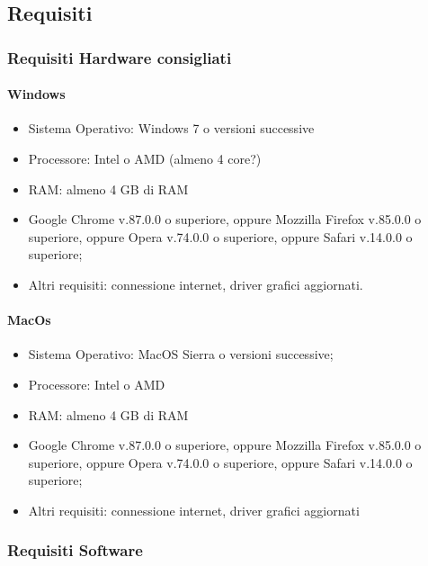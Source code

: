 \documentclass[../manuale_utente.tex]{subfiles}
\begin{document}
\subsection{Requisiti}
    \label{sec:requisiti}
\subsubsection{Requisiti Hardware consigliati}
    \label{subsub:req_h}

\paragraph{Windows}
    \label{par:Windows_req}

\begin{itemize}
    \item Sistema Operativo: Windows 7 o versioni successive
    \item Processore: Intel o AMD (almeno 4 core?)
    \item RAM: almeno 4 GB di RAM
    \item Google Chrome v.87.0.0 o superiore, oppure Mozzilla Firefox v.85.0.0 o superiore, oppure Opera v.74.0.0 o superiore, oppure Safari v.14.0.0 o superiore;
    \item Altri requisiti: connessione internet, driver grafici aggiornati.
\end{itemize}

\paragraph{MacOs}
    \label{par:mac_req}

\begin{itemize}
    \item Sistema Operativo: MacOS Sierra o versioni successive;
    \item Processore: Intel o AMD
    \item RAM: almeno 4 GB di RAM
    \item Google Chrome v.87.0.0 o superiore, oppure Mozzilla Firefox v.85.0.0 o superiore, oppure Opera v.74.0.0 o superiore, oppure Safari v.14.0.0 o superiore;
    \item Altri requisiti: connessione internet, driver grafici aggiornati
\end{itemize}

\subsubsection{Requisiti Software}
    \label{subsub:req_s}
\end{document}
